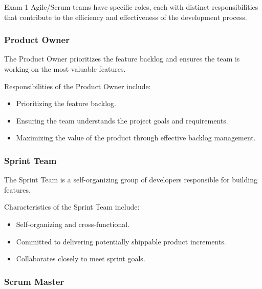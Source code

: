 \begin{examnotes}{Exam 1}
    Agile/Scrum teams have specific roles, each with distinct responsibilities that contribute to the efficiency and effectiveness of the development process.
    
    \subsubsection*{Product Owner}
    
    The Product Owner prioritizes the feature backlog and ensures the team is working on the most valuable features.
    
    \begin{highlight}
        Responsibilities of the Product Owner include:
        
        \begin{itemize}
            \item Prioritizing the feature backlog.
            \item Ensuring the team understands the project goals and requirements.
            \item Maximizing the value of the product through effective backlog management.
        \end{itemize}
    \end{highlight}
    
    \subsubsection*{Sprint Team}
    
    The Sprint Team is a self-organizing group of developers responsible for building features.
    
    \begin{highlight}
        Characteristics of the Sprint Team include:
        
        \begin{itemize}
            \item Self-organizing and cross-functional.
            \item Committed to delivering potentially shippable product increments.
            \item Collaborates closely to meet sprint goals.
        \end{itemize}
    \end{highlight}
    
    \subsubsection*{Scrum Master}
    

\end{examnotes}
